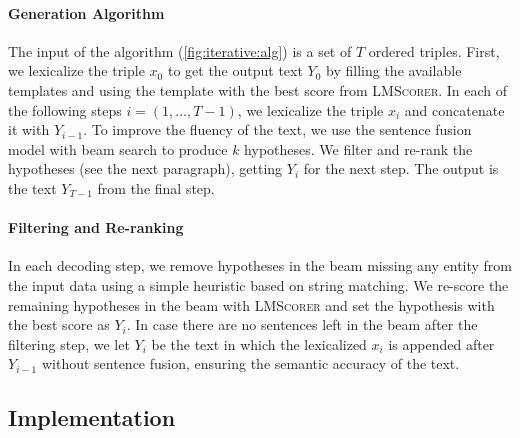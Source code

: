 \paragraph{Generation Algorithm}
The input of the algorithm (\autoref{fig:iterative:alg}) is a set of $T$ ordered triples. First, we lexicalize the triple $x_0$ to get the output text $Y_0$ by filling the available templates and using the template with the best score from \textsc{LMScorer}.
In each of the following steps $i=(1, \ldots, T-1)$, we lexicalize the triple $x_i$ and concatenate it with $Y_{i-1}$.  To improve the fluency of the text, we use the sentence fusion model with beam search to produce $k$ hypotheses. We filter and re-rank the hypotheses (see the next paragraph), getting $Y_{i}$ for the next step. The output is the text $Y_{T-1}$ from the final step.


\paragraph{Filtering and Re-ranking} In each decoding step, we remove hypotheses in the beam missing any entity from the input data using a simple heuristic based on string matching. We re-score the remaining hypotheses in the beam with \textsc{LMScorer} and set the hypothesis with the best score as $Y_{i}$. In case there are no sentences left in the beam after the filtering step, we let $Y_{i}$ be the text in which the lexicalized $x_i$ is appended after $Y_{i-1}$ without sentence fusion, ensuring the semantic accuracy of the text.


\subsection{Implementation}
\label{sec:iterative:implementation}

